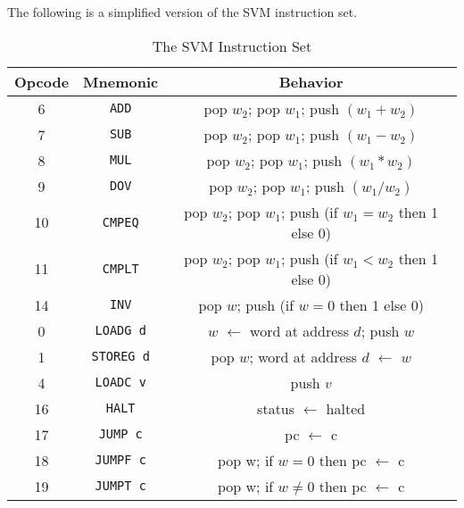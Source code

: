 \documentclass[a4paper, openany]{memoir}
\begin{document}
The following is a simplified version of the SVM instruction set.
\begin{table}[H]
    \centering
    \begin{tabular}{|c|c|c|}
        \hline
        Opcode & Mnemonic & Behavior \\
        \hline
        6 & \texttt{ADD} & pop $w_2$; pop $w_1$; push $(w_1 + w_2)$ \\
        7 & \texttt{SUB} & pop $w_2$; pop $w_1$; push $(w_1 - w_2)$ \\
        8 & \texttt{MUL} & pop $w_2$; pop $w_1$; push $(w_1 * w_2)$ \\
        9 & \texttt{DOV} & pop $w_2$; pop $w_1$; push $(w_1 / w_2)$ \\
        10 & \texttt{CMPEQ} & pop $w_2$; pop $w_1$; push (if $w_1 = w_2$ then 1 else 0) \\
        11 & \texttt{CMPLT} & pop $w_2$; pop $w_1$; push (if $w_1 < w_2$ then 1 else 0) \\
        14 & \texttt{INV} & pop $w$; push (if $w=0$ then 1 else 0) \\
        0 & \texttt{LOADG d} & $w$ $\leftarrow$ word at address $d$; push $w$ \\
        1 & \texttt{STOREG d} & pop $w$; word at address $d$ $\leftarrow$ $w$ \\
        4 & \texttt{LOADC v} & push $v$ \\
        16 & \texttt{HALT}  & status $\leftarrow$ halted \\
        17 & \texttt{JUMP c} & pc $\leftarrow$ c \\
        18 & \texttt{JUMPF c} & pop w; if $w = 0$ then pc $\leftarrow$ c \\
        19 & \texttt{JUMPT c} & pop w; if $w \neq 0$ then pc $\leftarrow$ c \\
        \hline
    \end{tabular}
    \caption{The SVM Instruction Set}
\end{table}
\end{document}
